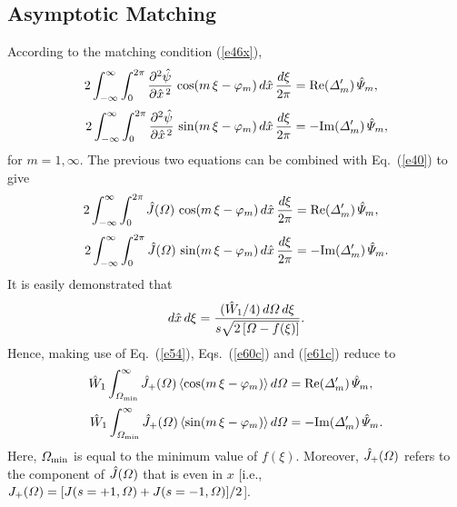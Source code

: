 \documentclass[12pt,prb,aps]{revtex4-1}
\begin{document}
\subsection{Asymptotic Matching} 
According to the matching condition (\ref{e46x}),
\begin{align}
2\int_{-\infty}^\infty \int_0^{2\pi} \frac{\partial^2\hat{\psi}}{\partial \hat{x}^{\,2}}\,\cos(m\,\xi-\varphi_m)\,d\hat{x}\,\frac{d\xi}{2\pi}& = {\rm Re}({\mit\Delta}_m')\,\hat{\mit\Psi}_m,\\[0.5ex]
2\int_{-\infty}^\infty \int_0^{2\pi} \frac{\partial^2\hat{\psi}}{\partial \hat{x}^{\,2}}\,\sin(m\,\xi-\varphi_m)\,d\hat{x}\,\frac{d\xi}{2\pi}& =-{\rm Im}({\mit\Delta}_m')\,\hat{\mit\Psi}_m,\label{e59}
\end{align}
for $m=1,\infty$. 
The previous two equations can be combined with Eq.~(\ref{e40}) to give 
\begin{align}\label{e60c}
2\int_{-\infty}^\infty \int_0^{2\pi} \hat{J}({\mit\Omega})\,\cos(m\,\xi-\varphi_m)\,d\hat{x}\,\frac{d\xi}{2\pi}& = {\rm Re}({\mit\Delta}_m')\,\hat{\mit\Psi}_m,\\[0.5ex]
2\int_{-\infty}^\infty \int_0^{2\pi} \hat{J}({\mit\Omega})\,\sin(m\,\xi-\varphi_m)\,d\hat{x}\,\frac{d\xi}{2\pi}& =-{\rm Im}({\mit\Delta}_m')\,\hat{\mit\Psi}_m.\label{e61c}
\end{align}
 It is easily demonstrated that 
\begin{equation}
d\hat{x}\,d\xi = \frac{(\hat{W}_1/4)\,d{\mit\Omega}\,d\xi}{s\sqrt{2\left[{\mit\Omega}-f(\xi)\right]}}.
\end{equation}
Hence, making use of  Eq.~(\ref{e54}), Eqs.~(\ref{e60c}) and (\ref{e61c}) reduce to 
\begin{align}\label{e63}
\hat{W}_1\int_{{\mit\Omega}_{\rm min}}^\infty\hat{J}_+({\mit\Omega})\,\langle\cos(m\,\xi-\varphi_m)\rangle\,d{\mit\Omega}&= {\rm Re}({\mit\Delta}_m')\,\hat{\mit\Psi}_m,\\[0.5ex]
\hat{W}_1\int_{{\mit\Omega}_{\rm min}}^\infty\hat{J}_+({\mit\Omega})\,\langle\sin(m\,\xi-\varphi_m)\rangle\,d{\mit\Omega}&=-{\rm Im}({\mit\Delta}_m')\,\hat{\mit\Psi}_m.\label{e64}
\end{align}
Here, ${\mit\Omega}_{\rm min}$ is equal to the minimum value of $f(\xi)$. Moreover, $\hat{J}_+({\mit\Omega})$ refers to the component of $\hat{J}({\mit\Omega})$ that is even in $x$ [i.e., $J_+({\mit\Omega})=
[J(s=+1,{\mit\Omega}) + J(s=-1,{\mit\Omega})]/2$].
\end{document}
